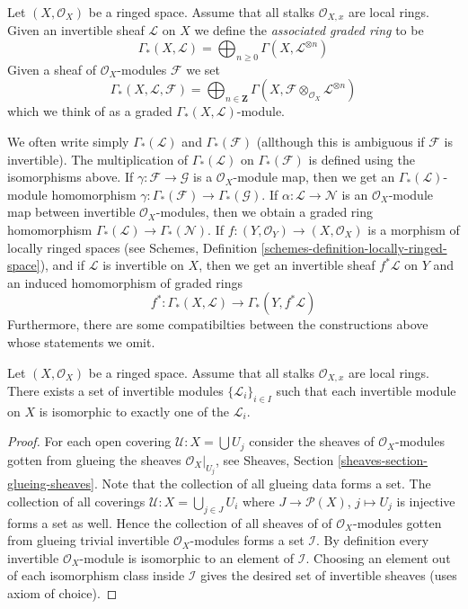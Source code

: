 \begin{definition}
\label{definition-gamma-star}
Let $(X, \mathcal{O}_X)$ be a ringed space.
Assume that all stalks $\mathcal{O}_{X, x}$ are local rings.
Given an invertible sheaf $\mathcal{L}$ on $X$ we define
the {\it associated graded ring} to be
$$
\Gamma_*(X, \mathcal{L})
=
\bigoplus\nolimits_{n \geq 0} \Gamma(X, \mathcal{L}^{\otimes n})
$$
Given a sheaf of $\mathcal{O}_X$-modules $\mathcal{F}$ we set
$$
\Gamma_*(X, \mathcal{L}, \mathcal{F})
=
\bigoplus\nolimits_{n \in \mathbf{Z}} \Gamma(X,
\mathcal{F} \otimes_{\mathcal{O}_X} \mathcal{L}^{\otimes n})
$$
which we think of as a graded $\Gamma_*(X, \mathcal{L})$-module.
\end{definition}

\noindent
We often write simply $\Gamma_*(\mathcal{L})$ and $\Gamma_*(\mathcal{F})$
(allthough this is ambiguous if $\mathcal{F}$ is invertible).
The multiplication of $\Gamma_*(\mathcal{L})$ on
$\Gamma_*(\mathcal{F})$ is defined using the isomorphisms
above. If $\gamma : \mathcal{F} \to \mathcal{G}$ is a $\mathcal{O}_X$-module
map, then we get an $\Gamma_*(\mathcal{L})$-module homomorphism
$\gamma : \Gamma_*(\mathcal{F}) \to \Gamma_*(\mathcal{G})$.
If $\alpha : \mathcal{L} \to \mathcal{N}$ is an $\mathcal{O}_X$-module
map between invertible $\mathcal{O}_X$-modules, then we obtain
a graded ring homomorphism $\Gamma_*(\mathcal{L}) \to \Gamma_*(\mathcal{N})$.
If $f : (Y, \mathcal{O}_Y) \to (X, \mathcal{O}_X)$
is a morphism of locally ringed spaces
(see Schemes, Definition \ref{schemes-definition-locally-ringed-space}),
and if $\mathcal{L}$ is invertible
on $X$, then we get an invertible sheaf $f^*\mathcal{L}$ on $Y$
and an induced homomorphism of graded rings
$$
f^* :
\Gamma_*(X, \mathcal{L})
\longrightarrow
\Gamma_*(Y, f^*\mathcal{L})
$$
Furthermore, there are some compatibilties between the constructions
above whose statements we omit.

\begin{lemma}
\label{lemma-pic-set}
Let $(X, \mathcal{O}_X)$ be a ringed space.
Assume that all stalks $\mathcal{O}_{X, x}$ are local rings.
There exists a set of invertible modules $\{\mathcal{L}_i\}_{i \in I}$
such that each invertible module on $X$ is isomorphic to exactly
one of the $\mathcal{L}_i$.
\end{lemma}

\begin{proof}
For each open covering $\mathcal{U} : X = \bigcup U_j$ consider the
sheaves of $\mathcal{O}_X$-modules gotten from glueing
the sheaves $\mathcal{O}_X|_{U_j}$, see Sheaves, Section
\ref{sheaves-section-glueing-sheaves}. Note that the collection of
all glueing data forms a set. The collection of all coverings
$\mathcal{U} : X = \bigcup_{j \in J} U_i$ where $J \to \mathcal{P}(X)$,
$j \mapsto U_j$ is injective forms a set as well. Hence the collection
of all sheaves of of $\mathcal{O}_X$-modules gotten from glueing
trivial invertible $\mathcal{O}_X$-modules forms a set $\mathcal{I}$.
By definition every invertible $\mathcal{O}_X$-module
is isomorphic to an element of $\mathcal{I}$. Choosing an
element out of each isomorphism class inside $\mathcal{I}$
gives the desired set of invertible sheaves (uses axiom of choice).
\end{proof}

